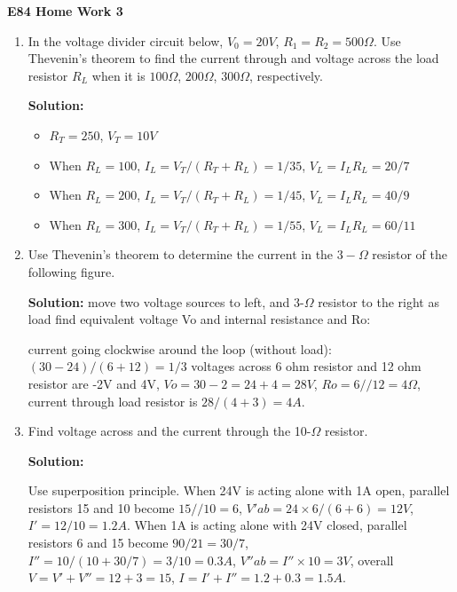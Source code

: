 \usepackage{html}

\begin{center}
{\Large \bf E84 Home Work 3}
\end{center}
\begin{enumerate}

\begin{enumerate}

\item In the voltage divider circuit below, $V_0=20V$, $R_1=R_2=500\Omega$. 
Use Thevenin's theorem to find the current through and voltage across the 
load resistor $R_L$ when it is $100\Omega$, $200\Omega$, $300\Omega$, 
respectively.


{\bf Solution:}
\begin{itemize}
\item $R_T=250$, $V_T=10V$
\item When $R_L=100$, $I_L=V_T/(R_T+R_L)=1/35$, $V_L=I_L R_L=20/7$
\item When $R_L=200$, $I_L=V_T/(R_T+R_L)=1/45$, $V_L=I_L R_L=40/9$
\item When $R_L=300$, $I_L=V_T/(R_T+R_L)=1/55$, $V_L=I_L R_L=60/11$
\end{itemize}

\item Use Thevenin's theorem to determine the current in the $3-\Omega$ 
resistor of the following figure.


{\bf Solution:}
move two voltage sources to left, and 3-$\Omega$ resistor to the right as load
find equivalent voltage Vo and internal resistance and Ro:

current going clockwise around the loop (without load): $(30-24)/(6+12)=1/3$
voltages across 6 ohm resistor and 12 ohm resistor are -2V and 4V, 
$Vo=30-2=24+4=28V$, $Ro=6//12=4\Omega$, current through load resistor is 
$28/(4+3)=4A$.

\item Find voltage across and the current through the 10-$\Omega$ resistor.


{\bf Solution:}

Use superposition principle. When 24V is acting alone with 1A open, 
parallel resistors 15 and 10 become $15//10=6$, $V'ab=24 \times 6/(6+6)=12V$,
$I'=12/10=1.2A$. When 1A is acting alone with 24V closed, parallel resistors
6 and 15 become $90/21=30/7$, $I''=10/(10+30/7)=3/10=0.3 A$, 
$V''ab=I'' \times 10=3V$, overall $V=V'+V''=12+3=15$, $I=I'+I''=1.2+0.3=1.5A$.


\end{enumerate}
\end{enumerate}
